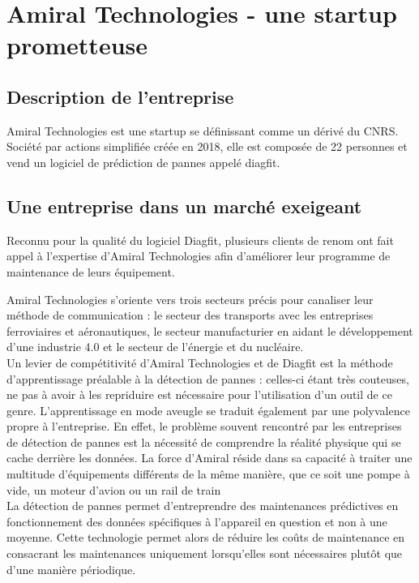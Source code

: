 \section{Amiral Technologies - une startup prometteuse}
\subsection{Description de l'entreprise}
Amiral Technologies est une startup se définissant comme un dérivé du CNRS. 
Société par actions simplifiée créée en 2018, elle est composée de 22 personnes et vend un logiciel de prédiction de pannes appelé diagfit.

\subsection{Une entreprise dans un marché exeigeant}
Reconnu pour la qualité du logiciel Diagfit, plusieurs clients de renom ont fait appel à l’expertise d’Amiral Technologies afin d'améliorer leur programme de maintenance de leurs équipement.


Amiral Technologies s'oriente vers trois secteurs précis pour canaliser leur méthode de communication : le secteur des transports avec les entreprises ferroviaires et aéronautiques, le secteur manufacturier en aidant le développement d'une industrie 4.0 et le secteur de l'énergie et du nucléaire.
\\
Un levier de compétitivité d'Amiral Technologies et de Diagfit est la méthode d'apprentissage préalable à la détection de pannes : celles-ci étant très couteuses, ne pas à avoir à les repriduire est nécessaire pour l'utilisation d'un outil de ce genre.
L'apprentissage en mode aveugle se traduit également par une polyvalence propre à l’entreprise. 
En effet, le problème souvent rencontré par les entreprises de détection de pannes est la nécessité de comprendre la réalité physique qui se cache derrière les données.
La force d’Amiral réside dans sa capacité à traiter une multitude d’équipements différents de la même manière, que ce soit une pompe à vide, un moteur d’avion ou un rail de train
\\
La détection de pannes permet d'entreprendre des maintenances prédictives en fonctionnement des données spécifiques à l'appareil en question et non à une moyenne.
Cette technologie permet alors de réduire les coûts de maintenance en consacrant les maintenances uniquement lorsqu'elles sont nécessaires plutôt que d'une manière périodique.


